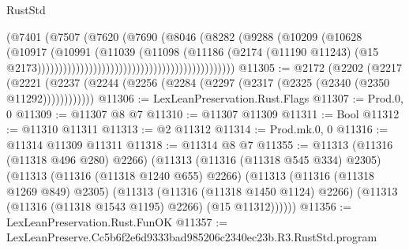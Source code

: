\begin{lexlean}{RustStd}
\begin{coremodule}
                                                                (@7401
                                                                  (@7507
                                                                    (@7620
                                                                      (@7690
                                                                        (@8046
                                                                          (@8282
                                                                            (@9288
                                                                              (@10209
                                                                                (@10628
                                                                                  (@10917
                                                                                    (@10991
                                                                                      (@11039
                                                                                        (@11098
                                                                                          (@11186
                                                                                            (@2174
                                                                                              (@11190
                                                                                                @11243)
                                                                                              (@15
                                                                                                @2173))))))))))))))))))))))))))))))))))))))))))))))
@11305 := @2172
    (@2202
      (@2217
        (@2221 (@2237 (@2244 (@2256 (@2284 (@2297 (@2317 (@2325 (@2340 (@2350 @11292))))))))))))
@11306 := LexLeanPreservation.Rust.Flags
@11307 := Prod.{0, 0}
@11309 := @11307 @8 @7
@11310 := @11307 @11309
@11311 := Bool
@11312 := @11310 @11311
@11313 := @2 @11312
@11314 := Prod.mk.{0, 0}
@11316 := @11314 @11309 @11311
@11318 := @11314 @8 @7
@11355 := @11313
    (@11316 (@11318 @496 @280) @2266)
    (@11313
      (@11316 (@11318 @545 @334) @2305)
      (@11313
        (@11316 (@11318 @1240 @655) @2266)
        (@11313
          (@11316 (@11318 @1269 @849) @2305)
          (@11313
            (@11316 (@11318 @1450 @1124) @2266)
            (@11313 (@11316 (@11318 @1543 @1195) @2266) (@15 @11312))))))
@11356 := LexLeanPreservation.Rust.FunOK
@11357 := LexLeanPreserve.Cc5b6f2e6d9333bad985206c2340ec23b.R3.RustStd.program

\end{coremodule}
\end{lexlean}
